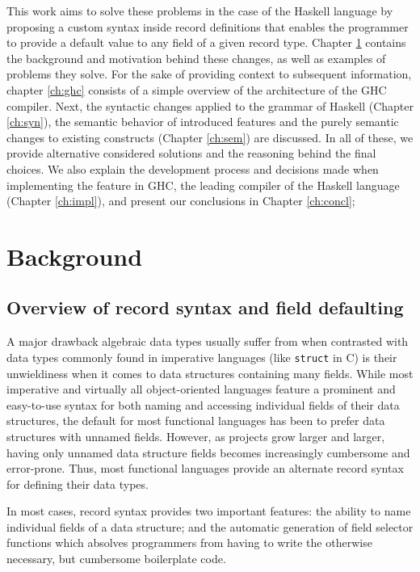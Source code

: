 \documentclass[en]{pracamgr}
\newcommand{\code}[1]{\lstinline[breaklines=true]{#1}}
\begin{document}
This work aims to solve these problems in the case of the Haskell language \cite{HudakHaskell}
by proposing a custom syntax inside record definitions that enables the programmer to provide a default value to any field of a given record type.
Chapter \ref*{ch:bg} contains the background and motivation behind these changes, as well as examples of problems they solve.
For the sake of providing context to subsequent information, chapter \ref*{ch:ghc}
consists of a simple overview of the architecture of the GHC compiler.
Next, the syntactic changes applied to the grammar of Haskell (Chapter \ref*{ch:syn}), 
the semantic behavior of introduced features 
and the purely semantic changes to existing constructs (Chapter \ref*{ch:sem}) are discussed.
In all of these, we provide alternative considered solutions and the reasoning behind the final choices.
We also explain the development process and decisions made when implementing the feature in GHC, 
the leading compiler of the Haskell language (Chapter \ref*{ch:impl}),
and present our conclusions in Chapter \ref*{ch:concl};


\chapter{Background}\label{ch:bg}
\section{Overview of record syntax and field defaulting}
A major drawback algebraic data types usually suffer from when contrasted with data types commonly found in imperative languages 
(like \code{struct} in C) is their unwieldiness when it comes to data structures containing many fields.
While most imperative and virtually all object-oriented languages feature a prominent and easy-to-use syntax 
for both naming and accessing individual fields of their data structures, the default for most functional languages
has been to prefer data structures with unnamed fields.
However, as projects grow larger and larger, having only unnamed data structure fields becomes increasingly cumbersome and error-prone.
Thus, most functional languages provide an alternate record syntax for defining their data types. 

In most cases, record syntax provides two important features: 
the ability to name individual fields of a data structure; 
and the automatic generation of field selector functions which
absolves programmers from having to write the otherwise necessary,
but cumbersome boilerplate code.
\end{document}

